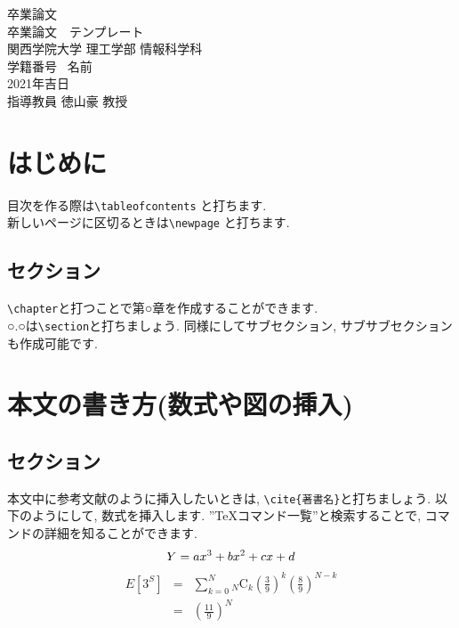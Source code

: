 \documentclass[a4paper,12pt]{jsreport}
\begin{document}
\begin{center}
\thispagestyle{empty}
{\Large 卒業論文}\\
\vspace*{1cm}
{\Huge 卒業論文　テンプレート}\\
\vspace*{2cm}
{\Large 関西学院大学 理工学部 情報科学科}\\
\vspace*{0.5cm}
{\LARGE 学籍番号 \ 名前}\\
\vspace*{9cm}
{\Large 2021年吉日}\\
\vspace*{2cm}
{\LARGE 指導教員 徳山豪 教授}
\end{center}

\newpage
{}
\tableofcontents


\newpage
\chapter{はじめに}
目次を作る際は\verb+\tableofcontents+ と打ちます.\\
新しいページに区切るときは\verb+\newpage+ と打ちます.
\section{セクション}
\verb+\chapter+と打つことで第○章を作成することができます.\\
○.○は\verb+\section+と打ちましょう. 同様にしてサブセクション, サブサブセクションも作成可能です.

\chapter{本文の書き方(数式や図の挿入)}
\section{セクション}
本文中に参考文献\cite{sample}のように挿入したいときは, \verb+\cite{著書名}+と打ちましょう.
以下のようにして, 数式を挿入します. ”TeXコマンド一覧”と検索することで, コマンドの詳細を知ることができます.
\begin{equation}
Y=ax^3+bx^2+cx+d \\
\end{equation}
\begin{eqnarray}
E[3^S] & = & \sum ^{N} _{k=0}{} _{N}\mathrm{C}_{k} \left( \frac{3}{9} \right)^{k} \left( \frac{8}{9} \right)^{N-k} \\
       & = & \left( \frac{11}{9}\right)^N \\
\end{eqnarray}
\end{document}
